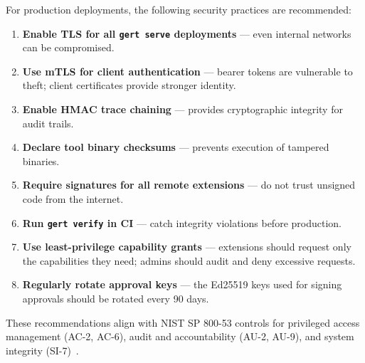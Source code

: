 For production deployments, the following security practices are recommended:

\begin{enumerate}
  \item \textbf{Enable TLS for all \texttt{gert serve} deployments} — even
        internal networks can be compromised.
  \item \textbf{Use mTLS for client authentication} — bearer tokens are
        vulnerable to theft; client certificates provide stronger identity.
  \item \textbf{Enable HMAC trace chaining} — provides cryptographic integrity
        for audit trails.
  \item \textbf{Declare tool binary checksums} — prevents execution of
        tampered binaries.
  \item \textbf{Require signatures for all remote extensions} — do not trust
        unsigned code from the internet.
  \item \textbf{Run \texttt{gert verify} in CI} — catch integrity violations
        before production.
  \item \textbf{Use least-privilege capability grants} — extensions should
        request only the capabilities they need; admins should audit and deny
        excessive requests.
  \item \textbf{Regularly rotate approval keys} — the Ed25519 keys used for
        signing approvals should be rotated every 90 days.
\end{enumerate}

These recommendations align with NIST SP 800-53 controls for privileged access
management (AC-2, AC-6), audit and accountability (AU-2, AU-9), and system
integrity (SI-7)~\cite{nist-sp800-53}.
